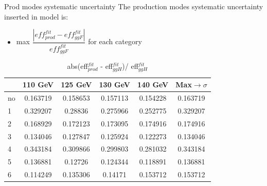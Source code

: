 \documentclass[10pt,UKenglish, leqno, xcolor = dvipsnames]{beamer}
\begin{document}
	\begin{frame}{Prod modes systematic uncertainty}
		\vfill
		The production modes systematic uncertainty inserted in model is:
		\begin{itemize}
			\item max $\dfrac{|eff^{fit}_{prod}-eff^{fit}_{ggF}|}{eff^{fit}_{ggF}}$ for each category
		\end{itemize}
		\begin{center}
			\begin{table}[tbp]
				\centering
				\begin{tabular}{lccccc}
					\toprule[1.5pt]
					& 110 GeV	& 125 GeV	& 130 GeV	& 140 GeV	& Max$\to\sigma$	\\
					\midrule
					no & 0.163719 & 0.158653 & 0.157113 & 0.154228 & 0.163719	\\
					1 & 0.329207 & 0.28836 & 0.275966 & 0.252775 & 0.329207		\\
					2 & 0.168929 & 0.172123 & 0.173095 & 0.174916 & 0.174916 	\\
					3 & 0.134046 & 0.127847 & 0.125924 & 0.122273 & 0.134046	\\
					4 & 0.343184 & 0.309866 & 0.299803 & 0.281032 & 0.343184	\\
					5 & 0.136881 & 0.12726 & 0.124344 & 0.118891 & 0.136881		\\
					6 & 0.114249 & 0.135306 & 0.14171 & 0.153712 & 0.153712		\\
					\bottomrule[1.5pt]
				\end{tabular}
				\caption{abs(eff$^{fit}_{prod}$ - eff$^{fit}_{ggH}$)/ eff$^{fit}_{ggH}$}
			\end{table}
		\end{center}
		\vfill
	\end{frame}
\end{document}
